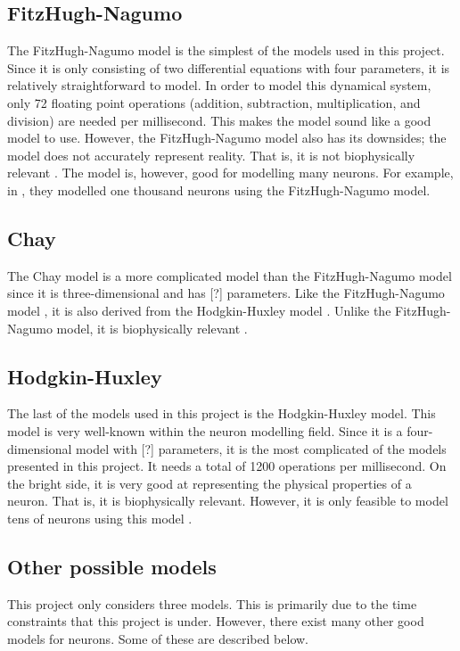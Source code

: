 \documentclass[class={myRUCProject}, crop=false]{standalone}
\begin{document}
\subsection{FitzHugh-Nagumo}
The FitzHugh-Nagumo model is the simplest of the models used in this project. Since it is only consisting of two differential equations with four parameters, it is relatively straightforward to model. In order to model this dynamical system, only 72 floating point operations (addition, subtraction, multiplication, and division) are needed per millisecond. This makes the model sound like a good model to use. However, the FitzHugh-Nagumo model also has its downsides; the model does not accurately represent reality. That is, it is not biophysically relevant \cite{Izhikevich2004}. The model is, however, good for modelling many neurons. For example, in \cite{Ibrahim2021}, they modelled one thousand neurons using the FitzHugh-Nagumo model.


\subsection{Chay}
The Chay model is a more complicated model than the FitzHugh-Nagumo model since it is three-dimensional and has [?] parameters. Like the FitzHugh-Nagumo model \cite{Baladron2012}, it is also derived from the Hodgkin-Huxley model \cite{Shadizadeh2022}. Unlike the FitzHugh-Nagumo model, it is biophysically relevant %
.


\subsection{Hodgkin-Huxley}
The last of the models used in this project is the Hodgkin-Huxley model. This model is very well-known within the neuron modelling field. Since it is a four-dimensional model with [?] parameters, it is the most complicated of the models presented in this project. It needs a total of 1200 operations per millisecond. On the bright side, it is very good at representing the physical properties of a neuron. That is, it is biophysically relevant. However, it is only feasible to model tens of neurons using this model \cite{Izhikevich2004}. 

\subsection{Other possible models}
This project only considers three models. This is primarily due to the time constraints that this project is under. However, there exist many other good models for neurons. Some of these are described below.
\end{document}

